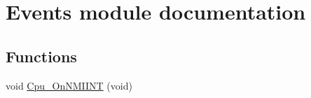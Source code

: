 \hypertarget{group___events__module}{\section{Events module documentation}
\label{group___events__module}
}
\subsection*{Functions}
\begin{DoxyCompactItemize}
\item 
\hypertarget{group___events__module_ga960d094664356278ac5472d45a6ea2f3}{void \hyperlink{group___events__module_ga960d094664356278ac5472d45a6ea2f3}{Cpu\-\_\-\-On\-N\-M\-I\-I\-N\-T} (void)}\label{group___events__module_ga960d094664356278ac5472d45a6ea2f3}


\end{DoxyCompactItemize}
